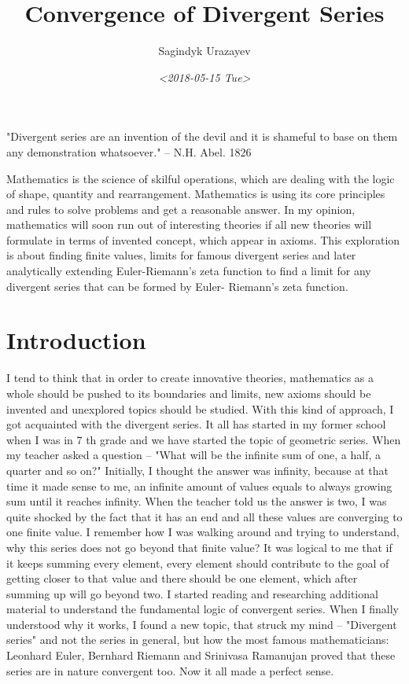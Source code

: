 \documentclass[a4paper]{article}
\author{Sagindyk Urazayev}
\date{\textit{<2018-05-15 Tue>}}
\title{Convergence of Divergent Series}
\begin{document}
\maketitle
\tableofcontents

\listoffigures
\listoftables

\newpage
\begin{center}
"Divergent series are an invention of the devil and it is shameful to base on
them any demonstration whatsoever."\cite{Abel} -- N.H. Abel. 1826
\end{center}

\begin{ABSTRACT}
Mathematics is the science of skilful operations, which are dealing with the
logic of shape, quantity and rearrangement. Mathematics is using its core
principles and rules to solve problems and get a reasonable answer. In my
opinion, mathematics will soon run out of interesting theories if all new
theories will formulate in terms of invented concept, which appear in
axioms. This exploration is about finding finite values, limits for famous
divergent series and later analytically extending Euler-Riemann's zeta function
to find a limit for any divergent series that can be formed by Euler- Riemann's
zeta function.
\end{ABSTRACT}

\section{Introduction}
\label{sec:org089950e}
\label{orge7e275f}

I tend to think that in order to create innovative theories, mathematics as a
whole should be pushed to its boundaries and limits, new axioms should be
invented and unexplored topics should be studied. With this kind of approach, I
got acquainted with the divergent series. It all has started in my former school
when I was in 7 th grade and we have started the topic of geometric series. When
my teacher asked a question – "What will be the infinite sum of one, a half, a
quarter and so on?" Initially, I thought the answer was infinity, because at
that time it made sense to me, an infinite amount of values equals to always
growing sum until it reaches infinity. When the teacher told us the answer is
two, I was quite shocked by the fact that it has an end and all these values are
converging to one finite value. I remember how I was walking around and trying
to understand, why this series does not go beyond that finite value? It was
logical to me that if it keeps summing every element, every element should
contribute to the goal of getting closer to that value and there should be one
element, which after summing up will go beyond two. I started reading and
researching additional material to understand the fundamental logic of
convergent series. When I finally understood why it works, I found a new topic,
that struck my mind – "Divergent series" and not the series in general, but how
the most famous mathematicians: Leonhard Euler, Bernhard Riemann and Srinivasa
Ramanujan proved that these series are in nature convergent too. Now it all made
a perfect sense.\\
\end{document}
